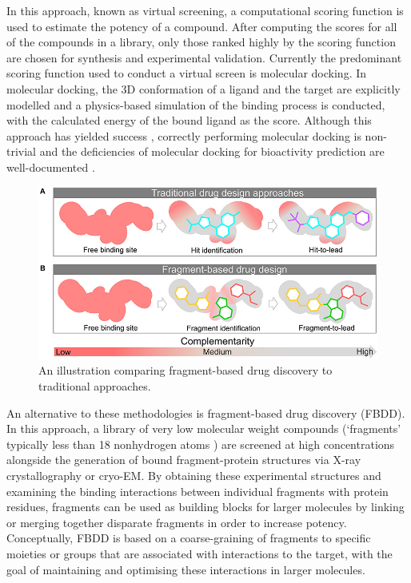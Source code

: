 In this approach, known as virtual screening, a computational scoring function is used to estimate the potency of a compound. After computing the scores for all of the compounds in a library, only those ranked highly by the scoring function are chosen for synthesis and experimental validation. Currently the predominant scoring function used to conduct a virtual screen is molecular docking. In molecular docking, the 3D conformation of a ligand and the target are explicitly modelled and a physics-based simulation of the binding process is conducted, with the calculated energy of the bound ligand as the score. Although this approach has yielded success \cite{Lyu2019UltraLargeDocking,Alon2021SigmaTwo}, correctly performing molecular docking is non-trivial and the deficiencies of molecular docking for bioactivity prediction are well-documented \cite{Llanos2021StrengthsAndWeaknesses, Macip2022HasteMakesWaste}.


\begin{figure}
    \centering
    \includegraphics[width=\linewidth]{Chapters/Ch2/Figs/fbdd_vs_trad.jpg}
    \caption{An illustration comparing fragment-based drug discovery to traditional approaches.}
    \label{fig:fbdd}
\end{figure}

An alternative to these methodologies is fragment-based drug discovery (FBDD). In this approach, a library of very low molecular weight compounds (`fragments' typically less than 18 nonhydrogen atoms \cite{David2017FBLD}) are screened at high concentrations alongside the generation of bound fragment-protein structures via X-ray crystallography or cryo-EM. By obtaining these experimental structures and examining the binding interactions between individual fragments with protein residues, fragments can be used as building blocks for larger molecules by linking or merging together disparate fragments in order to increase potency. Conceptually, FBDD is based on a coarse-graining of fragments to specific moieties or groups that are associated with interactions to the target, with the goal of maintaining and optimising these interactions in larger molecules.

